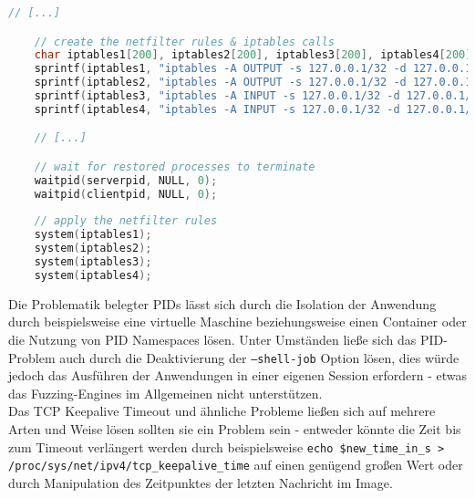 \documentclass[a4paper]{article}
\begin{document}
\begin{lstlisting}[caption=Setzen der Firewallregeln, language=C]
    // [...]

    // create the netfilter rules & iptables calls
    char iptables1[200], iptables2[200], iptables3[200], iptables4[200];
    sprintf(iptables1, "iptables -A OUTPUT -s 127.0.0.1/32 -d 127.0.0.1/32 -p tcp -m mark ! --mark 0xc114 -m tcp --sport %i --dport %i -j DROP", clientport, serverport);
    sprintf(iptables2, "iptables -A OUTPUT -s 127.0.0.1/32 -d 127.0.0.1/32 -p tcp -m mark ! --mark 0xc114 -m tcp --sport %i --dport %i -j DROP", serverport, clientport);
    sprintf(iptables3, "iptables -A INPUT -s 127.0.0.1/32 -d 127.0.0.1/32 -p tcp -m mark ! --mark 0xc114 -m tcp --sport %i --dport %i -j DROP", clientport, serverport);
    sprintf(iptables4, "iptables -A INPUT -s 127.0.0.1/32 -d 127.0.0.1/32 -p tcp -m mark ! --mark 0xc114 -m tcp --sport %i --dport %i -j DROP", serverport, clientport);

    // [...]

    // wait for restored processes to terminate
    waitpid(serverpid, NULL, 0);
    waitpid(clientpid, NULL, 0);
    
    // apply the netfilter rules
    system(iptables1);
    system(iptables2);
    system(iptables3);
    system(iptables4);
\end{lstlisting}
Die Problematik belegter PIDs lässt sich durch die Isolation der Anwendung durch beispielsweise eine virtuelle Maschine beziehungsweise einen Container oder die Nutzung von PID Namespaces lösen. 
Unter Umständen ließe sich das PID-Problem auch durch die Deaktivierung der \texttt{--shell-job} Option lösen, dies würde jedoch das Ausführen der Anwendungen in einer eigenen Session erfordern - etwas das Fuzzing-Engines im Allgemeinen nicht unterstützen.\\
Das TCP Keepalive Timeout und ähnliche Probleme ließen sich auf mehrere Arten und Weise lösen sollten sie ein Problem sein - entweder könnte die Zeit bis zum Timeout verlängert werden durch beispielsweise \texttt{echo \$new\_time\_in\_s > /proc/sys/net/ipv4/tcp\_keepalive\_time} auf einen genügend großen Wert oder durch Manipulation des Zeitpunktes der letzten Nachricht im Image.
\end{document}
